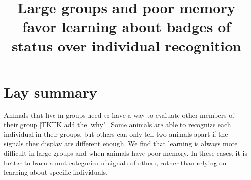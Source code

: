 





\noindent
\title{Large groups and poor memory favor learning about badges of status over individual recognition} 
\author{}
\date{} 
\maketitle


\linenumbers

\section*{Lay summary}
Animals that live in groups need to have a way to evaluate other members of their group [TKTK add the 'why']. Some animals are able to recognize each individual in their groups, but others can only tell two animals apart if the signals they display are different enough. We find that learning is always more difficult in large groups and when animals have poor memory. In these cases, it is better to learn about categories of signals of others, rather than relying on learning about specific individuals.

